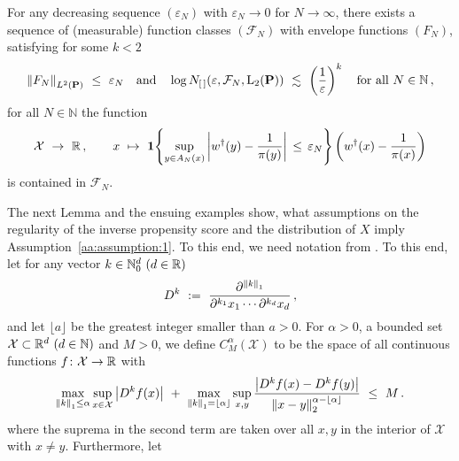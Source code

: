 \begin{assumption}
  \label{aa:assumption:1}
  For any decreasing sequence
  $(\varepsilon_N)$ with $\varepsilon_N\to 0$ for $N\to\infty$,
there exists a sequence of (measurable) function classes
$(\mathcal{F}_N)$
with envelope functions
$(F_N)$,
satisfying 
for some $k<2$
\begin{gather*}
\norm{F_N}_{L^2(\P)}
\ 
\le
\ 
\varepsilon_N
\quad
\text{and}
\quad
  \log
  N_{[\,]}(\varepsilon,\mathcal{F}_N,\mathrm{L}_2(\P))
  \ 
  \lesssim
  \ 
  \left( 
  \frac{1}{\varepsilon}
  \right)^k
  \quad
  \text{for all}
  \ 
  N\in\mathbb{N}
  \,,
\end{gather*}
for all $N\in\mathbb{N}$ the function
\begin{gather}
  \label{ghost_function}
  \mathcal{X}
  \ 
  \to
  \ 
  \R
  \,,
  \qquad
  x
  \ 
  \mapsto
  \ 
  \mathbf{1}{
    \left\{ 
      \sup_{y\in A_N(x)}
      \left| 
      w^\dagger(y)
      -
      \frac{1}{\pi(y)}
      \right|
      \,
      \le
      \,
      \varepsilon_N
    \right\}
  }
  \left( 
    w^\dagger(x)
      -
      \frac{1}{\pi(x)}
  \right)
\end{gather}
is contained in $\mathcal{F}_N$.
\end{assumption}
The next Lemma and the ensuing examples show, what assumptions on the regularity of the inverse propensity score and the distribution of $X$ imply Assumption~\ref{aa:assumption:1}.
To this end, we need notation from \cite[§2.7.1]{vaart2013}.
To this end, let for any vector $k\in\mathbb{N}_0^d \ (d\in\mathbb{R})$
\begin{gather*}
  D^k
  \ :=\ 
  \frac
  {\partial^{\norm{k}_1}}
  {
    \partial^{k_1}x_1
    \cdots
    \partial^{k_d}x_d
  }
  \,,
\end{gather*}
and let $\lfloor a \rfloor$ be the greatest integer smaller than $a>0$.
For $\alpha>0$, a bounded set 
$\mathcal{X}\subset\R^d\ (d\in\mathbb{N})$
and
$M>0$, we define $C^\alpha_M(\mathcal{X})$ to be the space of all continuous functions $f\colon \mathcal{X}\to\mathbb{R}$ with
\begin{gather*}
  \max_{\norm{k}_1\le \alpha}\sup_{x\in\mathcal{X}}
  \left| D^k f(x) \right|
  \ 
  +
  \ 
  \max_{\norm{k}_1=\lfloor \alpha \rfloor}\sup_{x,y}
  \frac
  {
  \left|
  D^k f(x) 
  -
  D^k f(y) 
  \right|
  }
  {
    \norm{x-y}_2^{\alpha-\lfloor \alpha \rfloor}
  }
  \
  \le
  \ 
  M
  \,.
\end{gather*}
where the suprema in the second term are taken over all $x,y$ in the interior of $\mathcal{X}$ with $x\neq y$.
Furthermore, let

